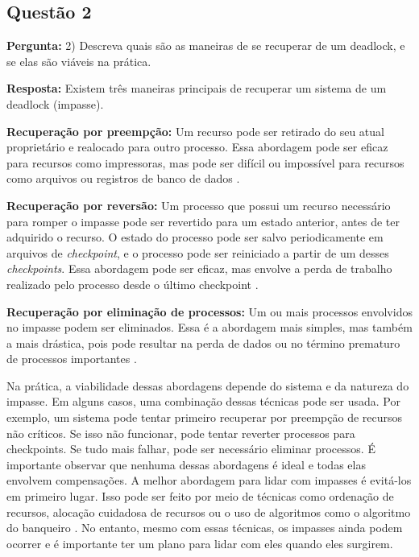 \documentclass{article}
\begin{document}
\subsection{Questão 2}

\textbf{Pergunta:} 2) Descreva quais são as maneiras de se recuperar de um deadlock, e se elas são viáveis na prática.\newline

\textbf{Resposta:} Existem três maneiras principais de recuperar um sistema de um deadlock (impasse).

\textbf{Recuperação por preempção: }Um recurso pode ser retirado do seu atual proprietário e realocado para outro processo. Essa abordagem pode ser eficaz para recursos como impressoras, mas pode ser difícil ou impossível para recursos como arquivos ou registros de banco de dados \parencite[p. 310]{tanenbaum2021}.

\textbf{Recuperação por reversão: }Um processo que possui um recurso necessário para romper o impasse pode ser revertido para um estado anterior, antes de ter adquirido o recurso. O estado do processo pode ser salvo periodicamente em arquivos de \textit{checkpoint}, e o processo pode ser reiniciado a partir de um desses \textit{checkpoints}. Essa abordagem pode ser eficaz, mas envolve a perda de trabalho realizado pelo processo desde o último checkpoint \parencite[p. 310]{tanenbaum2021}.

\textbf{Recuperação por eliminação de processos:} Um ou mais processos envolvidos no impasse podem ser eliminados. Essa é a abordagem mais simples, mas também a mais drástica, pois pode resultar na perda de dados ou no término prematuro de processos importantes  \parencite[p. 310]{tanenbaum2021}.\newline

Na prática, a viabilidade dessas abordagens depende do sistema e da natureza do impasse. Em alguns casos, uma combinação dessas técnicas pode ser usada. Por exemplo, um sistema pode tentar primeiro recuperar por preempção de recursos não críticos. Se isso não funcionar, pode tentar reverter processos para checkpoints. Se tudo mais falhar, pode ser necessário eliminar processos. É importante observar que nenhuma dessas abordagens é ideal e todas elas envolvem compensações. A melhor abordagem para lidar com impasses é evitá-los em primeiro lugar. Isso pode ser feito por meio de técnicas como ordenação de recursos, alocação cuidadosa de recursos ou o uso de algoritmos como o algoritmo do banqueiro \parencite[p. 316]{tanenbaum2021}. No entanto, mesmo com essas técnicas, os impasses ainda podem ocorrer e é importante ter um plano para lidar com eles quando eles surgirem.
\end{document}
